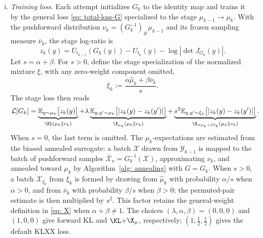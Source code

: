 \documentclass{article}
\begin{document}
\begin{enumerate}[(i)]
\item \emph{Training loss.} Each attempt initializes $G_k$ to the identity map and trains it by the general loss \eqref{eq: total-loss-G} specialized to the stage $\mu_{k-1}\to\mu_k$. With the pushforward distribution $\nu_k = (G_k^{-1})_{\#}\mu_{k-1}$ and its frozen sampling measure $\bar\nu_k$, the stage log-ratio is
\begin{equation*}
    z_k(y) = U_{t_{k-1}}(G_k(y)) - U_{t_k}(y) - \log|\det J_{G_k}(y)|.
\end{equation*}
Let $s=\alpha+\beta$. For $s>0$, define the stage specialization of the normalized mixture $\xi$, with any zero-weight component omitted,
\begin{equation*}
    \xi_k:=\frac{\alpha\hat\mu_k+\beta\bar\nu_k}{s}.
\end{equation*}
The stage loss then reads
\begin{align}
    \mathcal{L}[G_k]
    &= \underbrace{\mathbb{E}_{y \sim \mu_k}\bigl[z_k(y)\bigr]}_{\KL(\mu_k\|\nu_k)}
     + \lambda\underbrace{\mathbb{E}_{y, y' \sim \mu_k}\bigl[|z_k(y) - z_k(y')|\bigr]}_{\X_{\mu_k}(\mu_k\|\nu_k)}
     + \underbrace{s^2\mathbb{E}_{y, y' \sim \xi_k}\bigl[|z_k(y) - z_k(y')|\bigr]}_{\X_{\alpha\hat\mu_k+\beta\bar\nu_k}(\mu_k\|\nu_k)} .
    \label{eq: stage-loss}
\end{align}
When $s=0$, the last term is omitted. The $\mu_k$-expectations are estimated from the biased annealed surrogate: a batch $\mathcal X$ drawn from $\mathcal Y_{k-1}$ is mapped to the batch of pushforward samples $\bar{\mathcal X}_\nu = G_k^{-1}(\mathcal X)$, approximating $\nu_k$, and annealed toward $\mu_k$ by Algorithm~\ref{alg: annealing} with $G = G_k$. When $s>0$, a batch $\mathcal X_{\xi_k}$ from $\xi_k$ is formed by drawing from $\hat\mu_k$ with probability $\alpha/s$ when $\alpha>0$, and from $\bar\nu_k$ with probability $\beta/s$ when $\beta>0$; the permuted-pair estimate is then multiplied by $s^2$. This factor retains the general-weight definition in \eqref{eq: X} when $\alpha+\beta\ne1$. The choices $(\lambda,\alpha,\beta)=(0,0,0)$ and $(1,0,0)$ give forward KL and $\KL$+$\X_{\mu}$, respectively; $(1,\frac12,\frac12)$ gives the default KLXX loss.


\end{enumerate}
\end{document}
